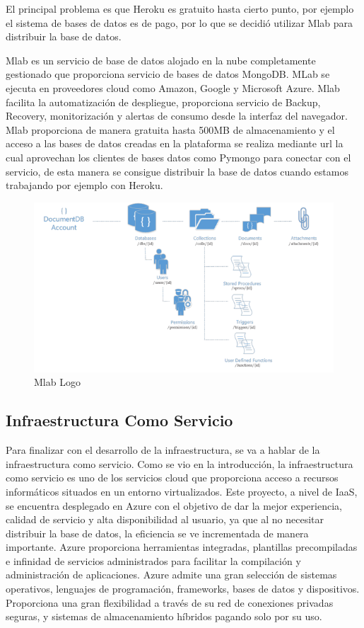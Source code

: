 \documentclass[a4paper,11pt]{book}
\begin{document}
El principal problema es que Heroku es gratuito hasta cierto punto, por ejemplo el sistema de bases de datos es de pago, por lo que se decidió utilizar Mlab para distribuir la base de datos.

Mlab\cite{mlab} es un servicio de base de datos alojado en la nube completamente gestionado que proporciona servicio de bases de datos MongoDB. MLab se ejecuta en proveedores cloud como Amazon, Google y Microsoft Azure. Mlab facilita la automatización de despliegue, proporciona servicio de Backup, Recovery, monitorización y alertas de consumo desde la interfaz del navegador. Mlab proporciona de manera gratuita hasta 500MB de almacenamiento y el acceso a las bases de datos creadas en la plataforma se realiza mediante url la cual aprovechan los clientes de bases datos como Pymongo para conectar con el servicio, de esta manera se consigue distribuir la base de datos cuando estamos trabajando por ejemplo con Heroku. 

\begin{figure}[H] 
\centering 
\includegraphics[scale=0.50]{imagenes/desarrollo_herramienta/mlab.png}
\caption{ Mlab Logo\cite{mlabL}  }  
\end{figure} 
  

\subsection{Infraestructura Como Servicio}
Para finalizar con el desarrollo de la infraestructura, se va a hablar de la infraestructura como servicio. Como se vio en la introducción, la infraestructura como servicio es uno de los servicios cloud que proporciona acceso a recursos informáticos situados en un entorno virtualizados. Este proyecto, a nivel de IaaS, se encuentra desplegado en Azure\cite{azure} con el objetivo de  dar la mejor experiencia, calidad de servicio y alta disponibilidad al usuario, ya que al no necesitar distribuir la base de datos, la eficiencia se ve incrementada de manera importante.
Azure proporciona herramientas integradas, plantillas precompiladas e infinidad de servicios administrados para facilitar la compilación y administración de aplicaciones. Azure admite una gran selección de sistemas operativos, lenguajes de programación, frameworks, bases de datos y dispositivos. Proporciona una gran flexibilidad a través de su red de conexiones privadas seguras, y sistemas de almacenamiento híbridos pagando solo por su uso. 
\end{document}
